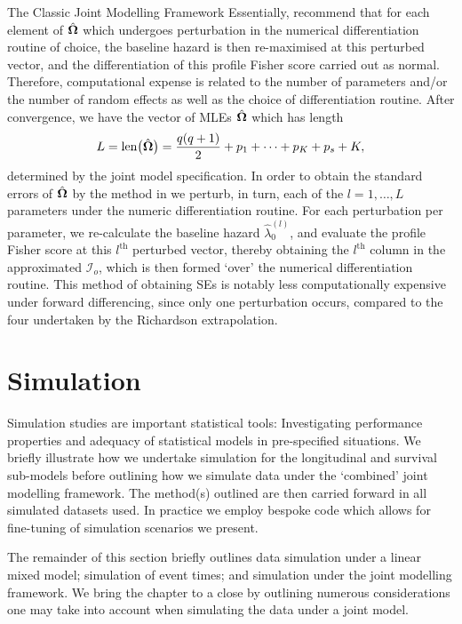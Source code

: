 \begin{chapter}{\label{cha:methods-classic}The Classic Joint Modelling Framework}
  Essentially, \citet{Xu2014} recommend that for each element of $\hat{\bm{\Omega}}$ which undergoes perturbation in the numerical differentiation routine of choice, the baseline hazard is then re-maximised at this perturbed vector, and the differentiation of this profile Fisher score carried out as normal. Therefore, computational expense is related to the number of parameters and/or the number of random effects as well as the choice of differentiation routine. After convergence, we have the vector of MLEs $\hat{\bm{\Omega}}$ which has length
  \begin{equation}
      L=\mathrm{len}\big(\hat{\bm{\Omega}}\big)=\frac{q\!\left( q+1\right)}{2}+p_1+\dots+p_K+p_s+K,
  \label{eq:methods-length-of-omega}
  \end{equation}
  determined by the joint model specification. In order to obtain the standard errors of $\hat{\bm{\Omega}}$ by the method in \citet{Xu2014} we perturb, in turn, each of the $l=1,\dots,L$ parameters under the numeric differentiation routine. For each perturbation per parameter, we re-calculate the baseline hazard $\hat{\lambda}^{(l)}_0$, and evaluate the profile Fisher score at this $l^{\mathrm{th}}$ perturbed vector, thereby obtaining the $l^{\mathrm{th}}$ column in the approximated $\mathcal{I}_o$, which is then formed `over' the numerical differentiation routine. This method of obtaining SEs is notably less computationally expensive under forward differencing, since only one perturbation occurs, compared to the four undertaken by the Richardson extrapolation.
  
  \section{\label{sec:methods-simulation}Simulation}
  Simulation studies are important statistical tools: Investigating performance properties and adequacy of statistical models in pre-specified situations. We briefly illustrate how we undertake simulation for the longitudinal and survival sub-models before outlining how we simulate data under the `combined' joint modelling framework. The method(s) outlined are then carried forward in all simulated datasets used. In practice we employ bespoke code which allows for fine-tuning of simulation scenarios we present. 
  
  The remainder of this section briefly outlines data simulation under a linear mixed model; simulation of event times; and simulation under the joint modelling framework. We bring the chapter to a close by outlining numerous considerations one may take into account when simulating the data under a joint model.
  

\end{chapter}
